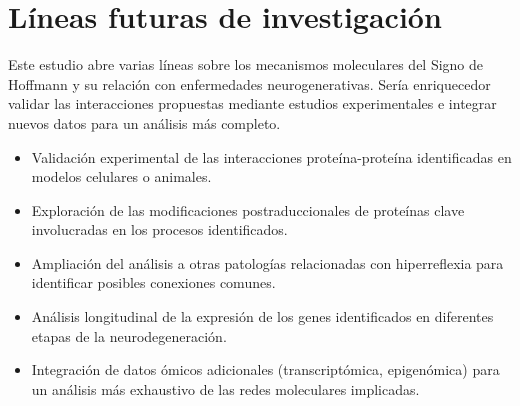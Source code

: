 \section{Líneas futuras de investigación}

Este estudio abre varias líneas sobre los mecanismos moleculares del Signo de Hoffmann y su relación con enfermedades neurogenerativas. Sería enriquecedor validar las interacciones propuestas mediante estudios experimentales e integrar nuevos datos para un análisis más completo.

\begin{itemize}
	\item Validación experimental de las interacciones proteína-proteína identificadas en modelos celulares o animales.
	\item Exploración de las modificaciones postraduccionales de proteínas clave involucradas en los procesos identificados.
	\item Ampliación del análisis a otras patologías relacionadas con hiperreflexia para identificar posibles conexiones comunes.
	\item Análisis longitudinal de la expresión de los genes identificados en diferentes etapas de la neurodegeneración.
	\item Integración de datos ómicos adicionales (transcriptómica, epigenómica) para un análisis más exhaustivo de las redes moleculares implicadas.
\end{itemize}

